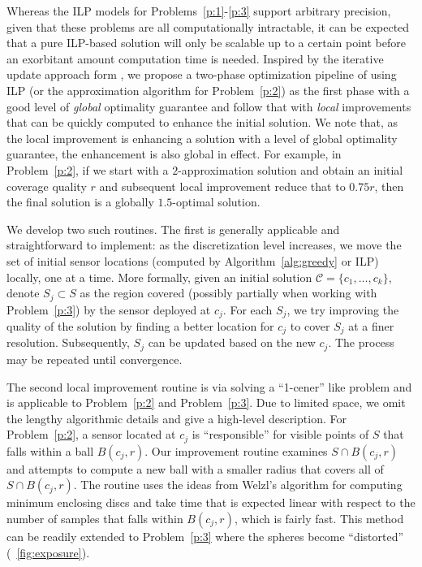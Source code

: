 Whereas the ILP models for Problems~\ref{p:1}-\ref{p:3} support arbitrary precision, given that these problems are all computationally intractable, it can be expected that a pure ILP-based solution will only be scalable up to a certain point before an exorbitant amount computation time is needed. Inspired by the iterative update approach form \cite{cortes2004coverage}, we propose a two-phase optimization pipeline of using ILP (or the approximation algorithm for Problem~\ref{p:2}) as the first phase with a good level of \emph{global} optimality guarantee and follow that with \emph{local} improvements that can be quickly computed to enhance the initial solution. We note that, as the local improvement is enhancing a solution with a level of global optimality guarantee, the enhancement is also global in effect. For example, in Problem~\ref{p:2}, if we start with a $2$-approximation solution and obtain an initial coverage quality $r$ and subsequent local improvement reduce that to $0.75r$, then the final solution is a globally $1.5$-optimal solution.

We develop two such routines. The first is generally applicable and straightforward to implement: as the discretization level increases, we move the set of initial sensor locations (computed by Algorithm~\ref{alg:greedy} or ILP) locally, one at a time. More formally, given an initial solution $\mathcal C = \{c_1, \dots, c_k\}$, denote $S_j \subset S$ as the region covered (possibly partially when working with Problem~\ref{p:3}) by the sensor deployed at $c_j$. For each $S_j$, we try improving the quality of the solution by finding a better location for $c_j$ to cover $S_j$ at a finer resolution. Subsequently, $S_j$ can be updated based on the new $c_j$. The process may be repeated until convergence. 

The second local improvement routine is via solving a ``1-cener'' like problem and is applicable to Problem~\ref{p:2} and Problem~\ref{p:3}. Due to limited space, we omit the lengthy algorithmic details and give a high-level description. For Problem~\ref{p:2}, a sensor located at $c_j$ is ``responsible'' for visible points of $S$ that falls within a ball $B(c_j, r)$. Our improvement routine examines $S \cap B(c_j, r)$ and attempts to compute a new ball with a smaller radius that covers all of $S \cap B(c_j, r)$. The routine uses the ideas from Welzl's algorithm for computing minimum enclosing discs \cite{welzl1991smallest, Mark1997computation} and take time that is expected linear with respect to the number of samples that falls within $B(c_j, r)$, which is fairly fast. This method can be readily extended to Problem~\ref{p:3} where the spheres become ``distorted'' (~\ref{fig:exposure}).
